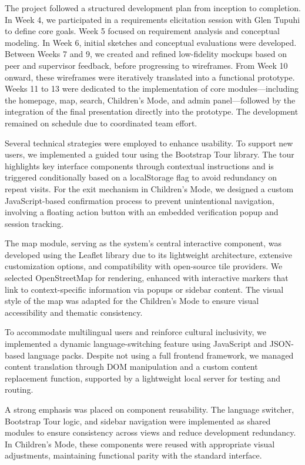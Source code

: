The project followed a structured development plan from inception to completion. In Week 4, we participated in a requirements elicitation session with Glen Tupuhi to define core goals. Week 5 focused on requirement analysis and conceptual modeling. In Week 6, initial sketches and conceptual evaluations were developed. Between Weeks 7 and 9, we created and refined low-fidelity mockups based on peer and supervisor feedback, before progressing to wireframes. From Week 10 onward, these wireframes were iteratively translated into a functional prototype. Weeks 11 to 13 were dedicated to the implementation of core modules—including the homepage, map, search, Children’s Mode, and admin panel—followed by the integration of the final presentation directly into the prototype. The development remained on schedule due to coordinated team effort.

Several technical strategies were employed to enhance usability. To support new users, we implemented a guided tour using the Bootstrap Tour library. The tour highlights key interface components through contextual instructions and is triggered conditionally based on a localStorage flag to avoid redundancy on repeat visits. For the exit mechanism in Children’s Mode, we designed a custom JavaScript-based confirmation process to prevent unintentional navigation, involving a floating action button with an embedded verification popup and session tracking.

The map module, serving as the system’s central interactive component, was developed using the Leaflet library due to its lightweight architecture, extensive customization options, and compatibility with open-source tile providers. We selected OpenStreetMap for rendering, enhanced with interactive markers that link to context-specific information via popups or sidebar content. The visual style of the map was adapted for the Children’s Mode to ensure visual accessibility and thematic consistency.

To accommodate multilingual users and reinforce cultural inclusivity, we implemented a dynamic language-switching feature using JavaScript and JSON-based language packs. Despite not using a full frontend framework, we managed content translation through DOM manipulation and a custom content replacement function, supported by a lightweight local server for testing and routing.

A strong emphasis was placed on component reusability. The language switcher, Bootstrap Tour logic, and sidebar navigation were implemented as shared modules to ensure consistency across views and reduce development redundancy. In Children’s Mode, these components were reused with appropriate visual adjustments, maintaining functional parity with the standard interface.

